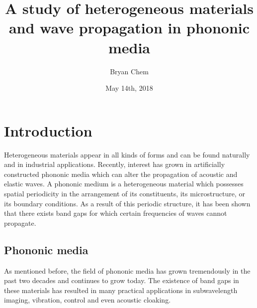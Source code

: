 \documentclass{article}
\title{A study of heterogeneous materials and wave propagation in phononic
media}
\author{Bryan Chem}
\date{May 14th, 2018}
\begin{document}

\maketitle
\newpage


\tableofcontents
\newpage


\section{Introduction}
Heterogeneous materials appear in all kinds of forms and can be found naturally 
and in industrial applications. Recently, interest has grown in artificially
constructed phononic media which can alter the propagation of acoustic and
elastic waves. A phononic medium is a heterogeneous material which possesses
spatial periodicity in the arrangement of its constituents, its microstructure,
or its boundary conditions. As a result of this periodic structure, it has been 
shown that there exists band gaps for which certain frequencies of waves cannot 
propagate.

\subsection{Phononic media}
As mentioned before, the field of phononic media has grown tremendously in the 
past two decades and continues to grow today. The existence of band gaps in 
these materials has resulted in many practical applications in subwavelength 
imaging, vibration, control and even acoustic cloaking.
\end{document}
